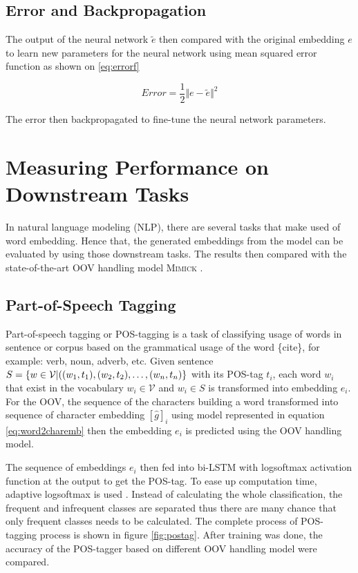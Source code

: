     \subsection{Error and Backpropagation}
        The output of the neural network $\tilde{e}$ then compared
        with the original embedding $e$ to learn new parameters for
        the neural network using mean squared error function as shown
        on \ref{eq:errorf}

        \begin{equation}
            \label{eq:errorf}
            Error = \frac{1}{2} \Vert e - \tilde{e} \Vert ^{2}
        \end{equation}

        The error then backpropagated to fine-tune the neural network
        parameters.
        
\section{Measuring Performance on Downstream Tasks}
    In natural language modeling (NLP), there are several tasks that
    make used of word embedding. Hence that, the generated embeddings
    from the model can be evaluated by using those downstream tasks.
    The results then compared with the state-of-the-art OOV handling
    model \textsc{Mimick} \citep{mimicking2017Pinter}.
    
    \subsection{Part-of-Speech Tagging}
        Part-of-speech tagging or POS-tagging is a task of classifying
        usage of words in sentence or corpus based on the grammatical
        usage of the word \{cite\}, for example: verb, noun, adverb,
        etc. Given sentence $S = \{w \in \mathcal{V} \vert ((w_1,
        t_1), (w_2, t_2)\\, \dots, (w_n, t_n)\}$ with its POS-tag $t_i$,
        each word $w_i$ that exist in the vocabulary $w_i \in
        \mathcal{V}$ and $w_i \in S$ is transformed into embedding
        $e_i$. For the OOV, the sequence of the characters building a
        word transformed into sequence of character embedding
        $[\hat{g}]_i$ using model represented in equation
        \ref{eq:word2charemb} then the embedding $e_i$ is predicted
        using the OOV handling model.

        The sequence of embeddings $e_i$ then fed into bi-LSTM with
        logsoftmax activation function at the output to get the
        POS-tag. To ease up computation time, adaptive logsoftmax is
        used \citep{grave2018efficientsoftmax}. Instead of calculating
        the whole classification, the frequent and infrequent classes
        are separated thus there are many chance that only frequent
        classes needs to be calculated. The complete process of
        POS-tagging process is shown in figure \ref{fig:postag}. After
        training was done, the accuracy of the POS-tagger based on
        different OOV handling model were compared.

